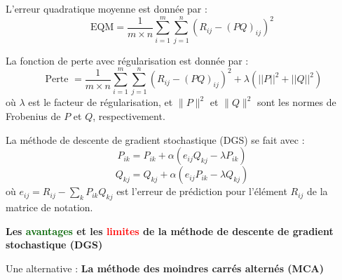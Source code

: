 \begin{frame}{\PartieI}
    L'erreur quadratique moyenne est donnée par :
    \begin{equation*}
        \mathrm{EQM}=\frac{1}{m \times n} \sum_{i=1}^m \sum_{j=1}^n\left(R_{i j}-(P Q)_{i j}\right)^2
    \end{equation*}

\end{frame}

\begin{frame}{\PartieI}
    La fonction de perte avec régularisation est donnée par :
    \begin{equation*}
        \text { Perte }=\frac{1}{m \times n} \sum_{i=1}^m \sum_{j=1}^n\left(R_{i j}-(P Q)_{i j}\right)^2+\lambda\left(||P||^2+||Q||^2\right)
    \end{equation*}
    où $\lambda$ est le facteur de régularisation, et $\|P\|^2$ et $\|Q\|^2$ sont les normes de Frobenius de $P$ et $Q$, respectivement.
\end{frame}

\begin{frame}{\PartieI}
    La méthode de descente de gradient stochastique (DGS) se fait avec :
    \begin{equation*}
        P_{i k}=P_{i k}+\alpha\left(e_{i j} Q_{k j}-\lambda P_{i k}\right)
    \end{equation*}
    \begin{equation*}
        Q_{k j}=Q_{k j}+\alpha\left(e_{i j} P_{i k}-\lambda Q_{k j}\right)
    \end{equation*}
    où $e_{i j}=R_{i j}-\sum_k P_{i k} Q_{k j}$ est l'erreur de prédiction pour l'élément $R_{i j}$ de la matrice de notation.
\end{frame}

\begin{frame}{\PartieI}
    \begin{center}
        \textbf{\large{Les \textcolor{darkgreen}{avantages} et les \textcolor{red}{limites} de la méthode de descente de gradient stochastique (DGS)}}
    \end{center}
\end{frame}

\begin{frame}{\PartieI}
    \begin{center}
        \large{Une alternative : \textbf{La méthode des moindres carrés alternés (MCA)}}
    \end{center}
\end{frame}

